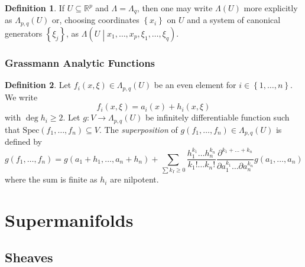 \documentclass{article}
\theoremstyle{definition}
\newtheorem{definition}{Definition}
\begin{document}
\begin{definition}
    If $U \subseteq \mathbb{R}^p$ and $\Lambda = \Lambda_q$, then one may write $\Lambda(U)$ more explicitly as $\Lambda_{p, q}(U)$ or, choosing coordinates $\left\{ x_i \right\}$ on $U$ and a system of canonical generators $\left\{ \xi_j \right\}$, as $\Lambda\left( U \middle| x_1, \dots, x_p, \xi_1, \dots, \xi_q \right)$.
\end{definition}


\subsubsection{Grassmann Analytic Functions}

\begin{definition}
    Let $f_i(x, \xi) \in \Lambda_{p,q}(U)$ be an even element for $i \in \left\{ 1, \dots, n \right\}$. We write
    \begin{equation*}
        f_i(x, \xi) = a_i(x) + h_i(x, \xi)
    \end{equation*}
    with $\deg h_i \geq 2$. Let $g: V \rightarrow \Lambda_{p, q}(U)$ be infinitely differentiable function such that $\text{Spec}(f_1, \dots, f_n) \subseteq V$. The \emph{superposition} of $g(f_1, \dots, f_n) \in \Lambda_{p, q}(U)$ is defined by
    \begin{equation*}
        g(f_1, \dots, f_n) = g(a_1 + h_1, \dots, a_n + h_n) +
        \sum_{\sum k_I \geq 0} \frac{h_1^{k_1} \dots h_n^{k_n}}{k_1! \dots k_n!}
        \frac{\partial^{k_1 + \dots + k_n}}{\partial a_1^{k_1} \dots \partial a_n^{k_n}}
        g(a_1, \dots, a_n)
    \end{equation*}
    where the sum is finite as $h_i$ are nilpotent.
\end{definition}











\newpage

\section{Supermanifolds}

\subsection{Sheaves}
\end{document}
